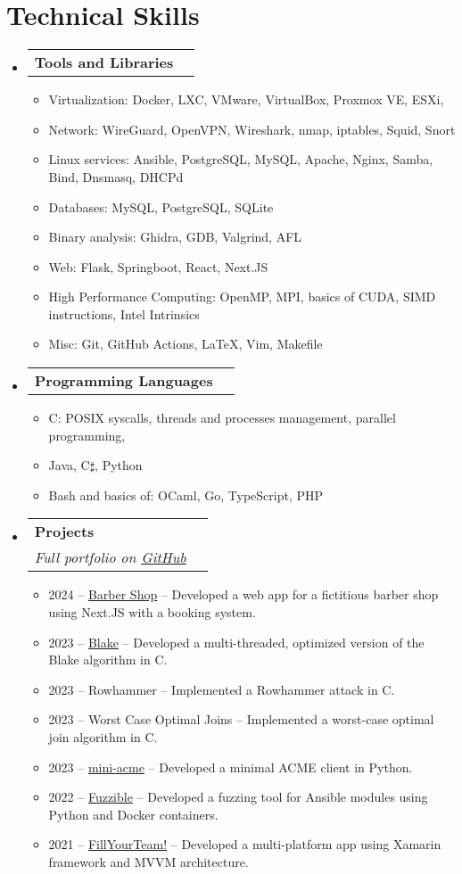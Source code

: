 \documentclass[letterpaper,11pt]{article}
\makeatletter
\newcommand{\resumeItem}[1]{
  \item\small{
    {#1 \vspace{-2pt}}
  }
}
\newcommand{\resumeSubheading}[4]{
  \vspace{-2pt}\item
    \begin{tabular*}{0.97\textwidth}[t]{l@{\extracolsep{\fill}}r}
      \textbf{#1} & #2 \\
      \textit{\small#3} & \textit{\small #4} \\
    \end{tabular*}\vspace{-7pt}
}
\newcommand{\resumeSlimSubheading}[2]{
  \vspace{-2pt}\item
    \begin{tabular*}{0.97\textwidth}[t]{l@{\extracolsep{\fill}}r}
      \textbf{#1} & #2 \\
    \end{tabular*}\vspace{-7pt}
}
\newcommand{\resumeSubHeadingListStart}{\begin{itemize}[leftmargin=0.15in, label={}]}
\newcommand{\resumeSubHeadingListEnd}{\end{itemize}}
\newcommand{\resumeItemListStart}{\begin{itemize}}
\newcommand{\resumeItemListEnd}{\end{itemize}\vspace{-5pt}}
\makeatother
\begin{document}
\section{Technical Skills}
\resumeSubHeadingListStart
\resumeSlimSubheading
{Tools and Libraries}{}
\resumeItemListStart
\resumeItem{Virtualization: Docker, LXC, VMware, VirtualBox, Proxmox VE, ESXi,  }
\resumeItem{Network: WireGuard, OpenVPN, Wireshark, nmap, iptables, Squid, Snort}
\resumeItem{Linux services: Ansible, PostgreSQL, MySQL, Apache, Nginx, Samba, Bind, Dnsmasq, DHCPd}
\resumeItem{Databases: MySQL, PostgreSQL, SQLite}
\resumeItem{Binary analysis: Ghidra, GDB, Valgrind, AFL}
\resumeItem{Web: Flask, Springboot, React, Next.JS}
\resumeItem{High Performance Computing: OpenMP, MPI, basics of CUDA, SIMD instructions, Intel Intrinsics}
\resumeItem{Misc: Git, GitHub Actions, LaTeX, Vim, Makefile}

\resumeItemListEnd

\resumeSlimSubheading
{Programming Languages}{}
\resumeItemListStart
\resumeItem{C: POSIX syscalls, threads and processes management, parallel programming, }
\resumeItem{Java, C$\sharp$, Python}
\resumeItem{Bash and basics of: OCaml, Go, TypeScript, PHP}
\resumeItemListEnd

\resumeSubheading
{Projects}{}
{Full portfolio on \href{https://github.com/filippovisconti}{\underline{GitHub}} }{}
\resumeItemListStart
\resumeItem{2024 -- \href{https://github.com/filippovisconti/barber-shop}{\underline{Barber Shop}} -- Developed a web app for a fictitious barber shop using Next.JS with a booking system.}
\resumeItem{2023 -- \href{https://github.com/filippovisconti/dphpc-project}{\underline{Blake}} -- Developed a multi-threaded, optimized version of the Blake algorithm in C.}
\resumeItem{2023 -- Rowhammer -- Implemented a Rowhammer attack in C.}
\resumeItem{2023 -- Worst Case Optimal Joins -- Implemented a worst-case optimal join algorithm in C.}
\resumeItem{2023 -- \href{https://github.com/filippovisconti/mini-acme}{\underline{mini-acme}} -- Developed a minimal ACME client in Python.}
\resumeItem{2022 -- \href{https://github.com/filippovisconti/Fuzzible}{\underline{Fuzzible}} -- Developed a fuzzing tool for Ansible modules using Python and Docker containers.}
\resumeItem{2021 -- \href{https://github.com/filippovisconti/mcproject}{\underline{FillYourTeam!}}  -- Developed a multi-platform app using Xamarin framework and MVVM architecture.}
\resumeItemListEnd
\resumeSubHeadingListEnd
\end{document}
